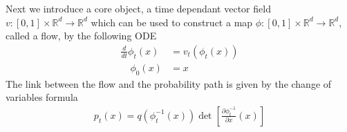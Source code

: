 \documentclass[a4paper,12pt]{article}
\begin{document}
\newpage

Next we introduce a core object, a time dependant vector field \(v:[0,1]\times \mathbb{R}^d\rightarrow\mathbb{R}^d\) which can be used to construct a map \(\phi:[0,1]\times\mathbb{R}^d\rightarrow\mathbb{R}^d\), called a flow, by the following ODE
\begin{align}
    \frac{d}{dt}\phi_t(x)&=v_t(\phi_t(x))\\
    \quad \phi_0(x)&=x \nonumber
\end{align}  
The link between the flow and the probability path is given by the change of variables formula 
\begin{align}
    p_t(x)=q(\phi_t^{-1}(x))\det \left[\frac{\partial\phi_t^{-1}}{\partial x}(x)\right]
\end{align}



\end{document}
